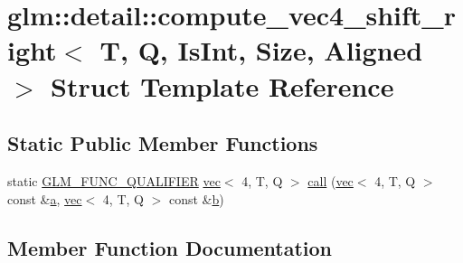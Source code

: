 \hypertarget{structglm_1_1detail_1_1compute__vec4__shift__right}{}\section{glm\+:\+:detail\+:\+:compute\+\_\+vec4\+\_\+shift\+\_\+right$<$ T, Q, Is\+Int, Size, Aligned $>$ Struct Template Reference}
\label{structglm_1_1detail_1_1compute__vec4__shift__right}
\subsection*{Static Public Member Functions}
\begin{DoxyCompactItemize}
\item 
static \hyperlink{setup_8hpp_a33fdea6f91c5f834105f7415e2a64407}{G\+L\+M\+\_\+\+F\+U\+N\+C\+\_\+\+Q\+U\+A\+L\+I\+F\+I\+ER} \hyperlink{structglm_1_1vec}{vec}$<$ 4, T, Q $>$ \hyperlink{structglm_1_1detail_1_1compute__vec4__shift__right_a8af4802653b2525d63fd1bc5fcd4f32e}{call} (\hyperlink{structglm_1_1vec}{vec}$<$ 4, T, Q $>$ const \&\hyperlink{_s_d_l__opengl__glext_8h_a3309789fc188587d666cda5ece79cf82}{a}, \hyperlink{structglm_1_1vec}{vec}$<$ 4, T, Q $>$ const \&\hyperlink{_s_d_l__opengl__glext_8h_a0f71581a41fd2264c8944126dabbd010}{b})
\end{DoxyCompactItemize}


\subsection{Member Function Documentation}
\mbox{\label{structglm_1_1detail_1_1compute__vec4__shift__right_a8af4802653b2525d63fd1bc5fcd4f32e}} 
